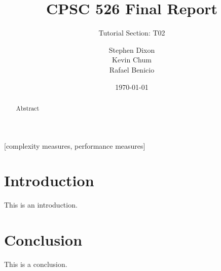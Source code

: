 \documentclass{acm_proc_article-sp}
\begin{document}
\title{CPSC 526 Final Report}
\subtitle{Tutorial Section: T02}
\date{\today}
\author{
\alignauthor
Stephen Dixon\\
\alignauthor
Kevin Chum\\
\alignauthor
Rafael Benicio\\
}

\maketitle
\begin{abstract}
Abstract
\end{abstract}

[complexity measures, performance measures]



\section{Introduction}

This is an introduction.

\section{Conclusion}

This is a conclusion\cite{mint16:release}.


\printbibliography{}
\end{document}
